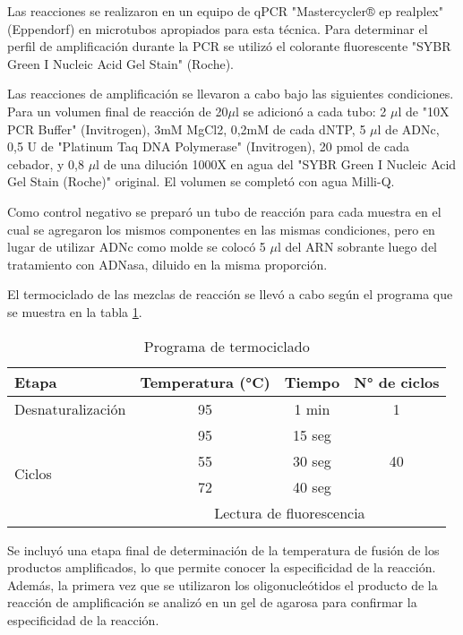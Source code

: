 Las reacciones se realizaron en un equipo de qPCR "Mastercycler® ep realplex" (Eppendorf) en microtubos apropiados para esta técnica. 
Para determinar el perfil de amplificación durante la PCR se utilizó el colorante fluorescente "SYBR Green I Nucleic Acid Gel Stain" (Roche).

Las reacciones de amplificación se llevaron a cabo bajo las siguientes condiciones.
Para un volumen final de reacción de 20$\mu$l se adicionó a cada tubo: 2 $\mu$l de "10X PCR Buffer" (Invitrogen), 3mM MgCl2, 0,2mM de cada dNTP, 5 $\mu$l de ADNc, 0,5 U de "Platinum Taq DNA Polymerase" (Invitrogen), 20 pmol de cada cebador, y 0,8 $\mu$l de una dilución 1000X en agua del "SYBR Green I Nucleic Acid Gel Stain (Roche)" original.
El volumen se completó con agua Milli-Q.

Como control negativo se preparó un tubo de reacción para cada muestra en el cual se agregaron los mismos componentes en las mismas condiciones, pero en lugar de utilizar ADNc como molde se colocó 5 $\mu$l del ARN sobrante luego del tratamiento con ADNasa, diluido en la misma proporción.

El termociclado de las mezclas de reacción se llevó a cabo según el programa que se muestra en la tabla \ref{table:termociclado}.


\begin{table}[!htbp]
\centering
\small
\caption{Programa de termociclado}
\label{table:termociclado}
\begin{tabular}{|l|c|c|c|}
\hline
Etapa                   & Temperatura (°C) & Tiempo & N° de ciclos        \\ \hline
Desnaturalización       & 95               & 1 min  & 1                   \\ \hline
\multirow{4}{*}{Ciclos} & 95               & 15 seg & \multirow{3}{*}{40} \\ \cline{2-3}
                        & 55               & 30 seg &                     \\ \cline{2-3}
                        & 72               & 40 seg &                     \\ \cline{2-4} 
                        & \multicolumn{3}{c|}{Lectura de fluorescencia}   \\ \hline
\end{tabular}
\end{table}

Se incluyó una etapa final de determinación de la temperatura de fusión de los productos amplificados, lo que permite conocer la especificidad de la reacción. 
Además, la primera vez que se utilizaron los oligonucleótidos el producto de la reacción de amplificación se analizó en un gel de agarosa para confirmar la especificidad de la reacción.

